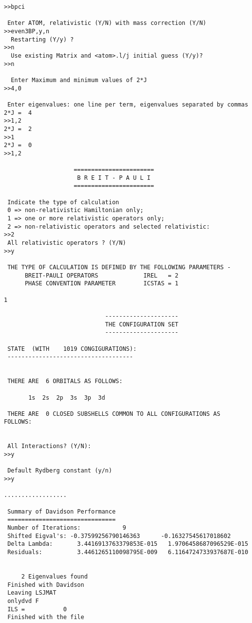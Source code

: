 \documentclass[fleqn,10pt]{book}
\begin{document}
\begin{verbatim}
>>bpci

 Enter ATOM, relativistic (Y/N) with mass correction (Y/N)
>>even3BP,y,n
  Restarting (Y/y) ?
>>n
  Use existing Matrix and <atom>.l/j initial guess (Y/y)?
>>n

  Enter Maximum and minimum values of 2*J
>>4,0

 Enter eigenvalues: one line per term, eigenvalues separated by commas
2*J =  4
>>1,2
2*J =  2
>>1
2*J =  0
>>1,2

                    =======================
                     B R E I T - P A U L I 
                    =======================

 Indicate the type of calculation 
 0 => non-relativistic Hamiltonian only;
 1 => one or more relativistic operators only;
 2 => non-relativistic operators and selected relativistic:  
>>2
 All relativistic operators ? (Y/N) 
>>y

 THE TYPE OF CALCULATION IS DEFINED BY THE FOLLOWING PARAMETERS - 
      BREIT-PAULI OPERATORS             IREL   = 2
      PHASE CONVENTION PARAMETER        ICSTAS = 1

1

                             ---------------------
                             THE CONFIGURATION SET
                             ---------------------

 STATE  (WITH    1019 CONGIGURATIONS):
 ------------------------------------


 THERE ARE  6 ORBITALS AS FOLLOWS:

       1s  2s  2p  3s  3p  3d

 THERE ARE  0 CLOSED SUBSHELLS COMMON TO ALL CONFIGURATIONS AS FOLLOWS:


 All Interactions? (Y/N): 
>>y

 Default Rydberg constant (y/n)
>>y

..................

 Summary of Davidson Performance
 ===============================
 Number of Iterations:            9
 Shifted Eigval's: -0.37599256790146363      -0.16327545617018602     
 Delta Lambda:       3.4416913763379853E-015   1.9706458687096529E-015
 Residuals:          3.4461265110098795E-009   6.1164724733937687E-010


     2 Eigenvalues found
 Finished with Davidson
 Leaving LSJMAT
 onlydvd F
 ILS =           0
 Finished with the file










\end{verbatim}
\end{document}

